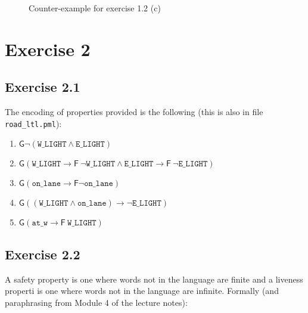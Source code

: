 \documentclass[12pt]{article}
\newcommand{\idea}[1]{\textcolor{darkyellow}{#1}}
\begin{document}
\begin{enumerate}[label=\roman*.]
\begin{enumerate}[label=(\alph*)]
\begin{figure}[ht]
      \caption{Counter-example for exercise 1.2 (c)}
      \label{fig:1-2-c}
    \end{figure}

\end{enumerate}


\section*{Exercise 2}

\subsection*{Exercise 2.1}

\idea{The encoding of properties provided is the following (this is also in file \texttt{road\_ltl.pml}):}

\begin{enumerate}[label=(\alph*)]
  \item $\mathsf{G}\neg(\texttt{W\_LIGHT} \wedge \texttt{E\_LIGHT})$

  \item $\mathsf{G}(\texttt{W\_LIGHT} \rightarrow \mathsf{F}~\neg\texttt{W\_LIGHT} \wedge \texttt{E\_LIGHT} \rightarrow \mathsf{F}~\neg\texttt{E\_LIGHT})$

  \item $\mathsf{G}(\texttt{on\_lane} \rightarrow \mathsf{F}\neg\texttt{on\_lane})$

  \item $\mathsf{G}((\texttt{W\_LIGHT} \wedge \texttt{on\_lane}) \rightarrow \neg\texttt{E\_LIGHT})$

  \item $\mathsf{G}(\texttt{at\_w} \rightarrow \mathsf{F}~\texttt{W\_LIGHT})$
\end{enumerate}

\subsection*{Exercise 2.2}

\idea{A safety property is one where words not in the language are finite and a liveness properti is one where words not in the language are infinite.}
\idea{Formally (and paraphrasing from Module 4 of the lecture notes):}


\end{enumerate}
\end{document}
